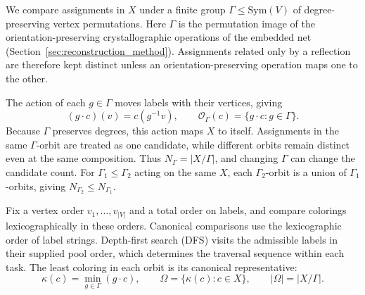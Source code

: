 \documentclass[a5paper, 10pt]{article}
\begin{document}
We compare assignments in $X$ under a finite group $\Gamma\leq\mathrm{Sym}(V)$ of degree-preserving vertex permutations.
Here $\Gamma$ is the permutation image of the orientation-preserving crystallographic operations of the embedded net (Section~\ref{sec:reconstruction_method}). Assignments related only by a reflection are therefore kept distinct unless an orientation-preserving operation maps one to the other.

The action of each $g\in\Gamma$ moves labels with their vertices, giving
\begin{equation}
(g\cdot c)(v)=c(g^{-1}v),\qquad
\mathcal{O}_{\Gamma}(c)=\{g\cdot c:g\in\Gamma\}.
\label{eq:group_action}
\end{equation}
Because $\Gamma$ preserves degrees, this action maps $X$ to itself. Assignments in the same $\Gamma$-orbit are treated as one candidate, while different orbits remain distinct even at the same composition. Thus $N_\Gamma=|X/\Gamma|$, and changing $\Gamma$ can change the candidate count. For $\Gamma_1\leq\Gamma_2$ acting on the same $X$, each $\Gamma_2$-orbit is a union of $\Gamma_1$-orbits, giving $N_{\Gamma_2}\leq N_{\Gamma_1}$.


Fix a vertex order $v_1,\ldots,v_{|V|}$ and a total order on labels, and compare colorings lexicographically in these orders. Canonical comparisons use the lexicographic order of label strings. Depth-first search (DFS) visits the admissible labels in their supplied pool order, which determines the traversal sequence within each task. The least coloring in each orbit is its canonical representative:
\begin{equation}
\kappa(c)=\min_{g\in\Gamma}(g\cdot c),\qquad
\Omega=\{\kappa(c):c\in X\},\qquad |\Omega|=|X/\Gamma|.
\label{eq:canonical_rep}
\end{equation}
\end{document}
